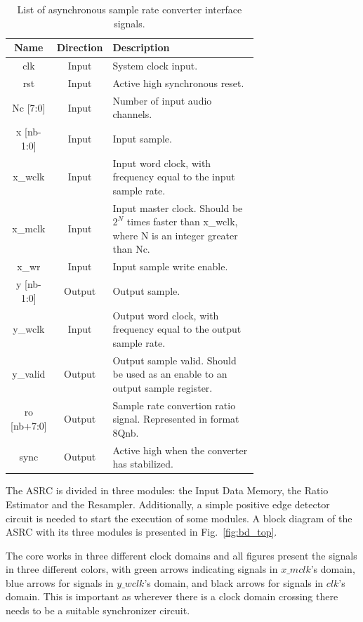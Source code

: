 \begin{table}[!htbp]
  \centering
  \caption{List of asynchronous sample rate converter interface signals.}
  \label{tab:top_iface}
  \begin{tabular}{|c|c|p{0.7\linewidth}|}
    \hline 
	{\bf Name} & {\bf Direction} & {\bf Description} \\ \hline
        \hline
	clk & Input & System clock input.\\ \hline
	rst & Input & Active high synchronous reset.\\ \hline
        \hline
        Nc [7:0] & Input & Number of input audio channels.\\ \hline
        \hline
        x [nb-1:0] & Input & Input sample.\\ \hline
        x\_wclk & Input & Input word clock, with frequency equal to the input sample rate.\\ \hline
        x\_mclk & Input & Input master clock. Should be $2^N$ times faster than x\_wclk, where N is an integer
        greater than Nc.\\ \hline
        x\_wr & Input & Input sample write enable.\\ \hline
        \hline
        y [nb-1:0] & Output & Output sample.\\ \hline
        y\_wclk & Input & Output word clock, with frequency equal to the output sample rate.\\ \hline
        y\_valid & Output & Output sample valid. Should be used as an enable to an output
        sample register.\\ \hline
        \hline
        ro [nb+7:0] & Output & Sample rate convertion ratio signal. Represented in format
        8Qnb.\\ \hline
        sync & Output & Active high when the converter has stabilized.\\ \hline
  \end{tabular}
\end{table}

The ASRC is divided in three modules: the Input Data Memory, the Ratio Estimator
and the Resampler. Additionally, a simple positive edge detector circuit is
needed to start the execution of some modules. A block diagram of the
ASRC with its three modules is presented in Fig.~\ref{fig:bd_top}.

The core works in three different clock domains and all figures present the
signals in three different colors, with green arrows indicating signals in
$x\_mclk$'s domain, blue arrows for signals in $y\_wclk$'s domain, and black
arrows for signals in $clk$'s domain. This is important as wherever there is a
clock domain crossing there needs to be a suitable synchronizer circuit.


